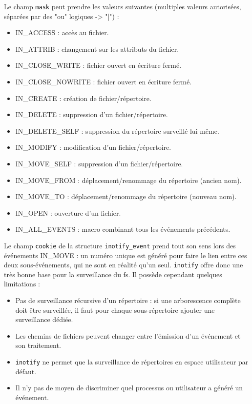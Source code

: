 \bigbreak
Le champ \texttt{mask} peut prendre les valeurs suivantes (multiples valeurs autorisées, 
séparées par des "ou" logiques -> "|") :
\begin{itemize}
    \item IN\_ACCESS : accès au fichier.
    \item IN\_ATTRIB : changement sur les attributs du fichier.
    \item IN\_CLOSE\_WRITE : fichier ouvert en écriture fermé.
    \item IN\_CLOSE\_NOWRITE : fichier ouvert en écriture fermé.
    \item IN\_CREATE : création de fichier/répertoire.
    \item IN\_DELETE : suppression d'un fichier/répertoire.
    \item IN\_DELETE\_SELF : suppression du répertoire surveillé lui-même.
    \item IN\_MODIFY : modification d'un fichier/répertoire.
    \item IN\_MOVE\_SELF : suppression d'un fichier/répertoire.
    \item IN\_MOVE\_FROM : déplacement/renommage du répertoire (ancien nom).
    \item IN\_MOVE\_TO : déplacement/renommage du répertoire (nouveau nom).
    \item IN\_OPEN : ouverture d'un fichier.
    \item IN\_ALL\_EVENTS : macro combinant tous les événements précédents.
\end{itemize}
Le champ \texttt{cookie} de la structure \texttt{inotify_event} prend tout son sens 
lors des événements IN\_MOVE : un numéro unique est généré pour faire le lien entre ces deux 
sous-événements, qui ne sont en réalité qu'un seul. \texttt{inotify} offre donc une très bonne base pour 
la surveillance du \acrshort{fs}. Il possède cependant quelques limitations :
\begin{itemize}
    \item Pas de surveillance récursive d'un répertoire : si une arborescence complète doit être 
        surveillée, il faut pour chaque sous-répertoire ajouter une surveillance dédiée.
    \item Les chemins de fichiers peuvent changer entre l'émission d'un événement et son traitement.
    \item \texttt{inotify} ne permet que la surveillance de répertoires en espace utilisateur par défaut.
    \item Il n'y pas de moyen de discriminer quel processus ou utilisateur a généré un événement.
\end{itemize}
